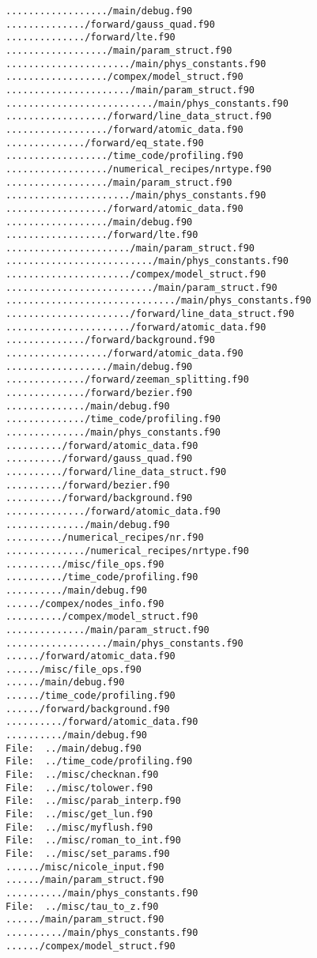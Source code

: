 \begin{verbatim}
................../main/debug.f90
............../forward/gauss_quad.f90
............../forward/lte.f90
................../main/param_struct.f90
....................../main/phys_constants.f90
................../compex/model_struct.f90
....................../main/param_struct.f90
........................../main/phys_constants.f90
................../forward/line_data_struct.f90
................../forward/atomic_data.f90
............../forward/eq_state.f90
................../time_code/profiling.f90
................../numerical_recipes/nrtype.f90
................../main/param_struct.f90
....................../main/phys_constants.f90
................../forward/atomic_data.f90
................../main/debug.f90
................../forward/lte.f90
....................../main/param_struct.f90
........................../main/phys_constants.f90
....................../compex/model_struct.f90
........................../main/param_struct.f90
............................../main/phys_constants.f90
....................../forward/line_data_struct.f90
....................../forward/atomic_data.f90
............../forward/background.f90
................../forward/atomic_data.f90
................../main/debug.f90
............../forward/zeeman_splitting.f90
............../forward/bezier.f90
............../main/debug.f90
............../time_code/profiling.f90
............../main/phys_constants.f90
........../forward/atomic_data.f90
........../forward/gauss_quad.f90
........../forward/line_data_struct.f90
........../forward/bezier.f90
........../forward/background.f90
............../forward/atomic_data.f90
............../main/debug.f90
........../numerical_recipes/nr.f90
............../numerical_recipes/nrtype.f90
........../misc/file_ops.f90
........../time_code/profiling.f90
........../main/debug.f90
....../compex/nodes_info.f90
........../compex/model_struct.f90
............../main/param_struct.f90
................../main/phys_constants.f90
....../forward/atomic_data.f90
....../misc/file_ops.f90
....../main/debug.f90
....../time_code/profiling.f90
....../forward/background.f90
........../forward/atomic_data.f90
........../main/debug.f90
File:  ../main/debug.f90
File:  ../time_code/profiling.f90
File:  ../misc/checknan.f90
File:  ../misc/tolower.f90
File:  ../misc/parab_interp.f90
File:  ../misc/get_lun.f90
File:  ../misc/myflush.f90
File:  ../misc/roman_to_int.f90
File:  ../misc/set_params.f90
....../misc/nicole_input.f90
....../main/param_struct.f90
........../main/phys_constants.f90
File:  ../misc/tau_to_z.f90
....../main/param_struct.f90
........../main/phys_constants.f90
....../compex/model_struct.f90

\end{verbatim}
